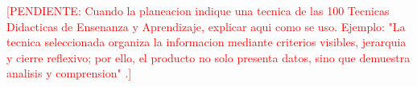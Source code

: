 \documentclass[
	spanish,
	letterpaper, oneside
]{article}
\newcommand{\pendiente}[1]{\textcolor{red}{[PENDIENTE: #1]}}
\begin{document}
\pendiente{Cuando la planeacion indique una tecnica de las 100 Tecnicas Didacticas de Ensenanza y Aprendizaje, explicar aqui como se uso. Ejemplo: "La tecnica seleccionada organiza la informacion mediante criterios visibles, jerarquia y cierre reflexivo; por ello, el producto no solo presenta datos, sino que demuestra analisis y comprension" \citep{unadm100TecnicasDidacticas2023}.}

%
\end{document}
